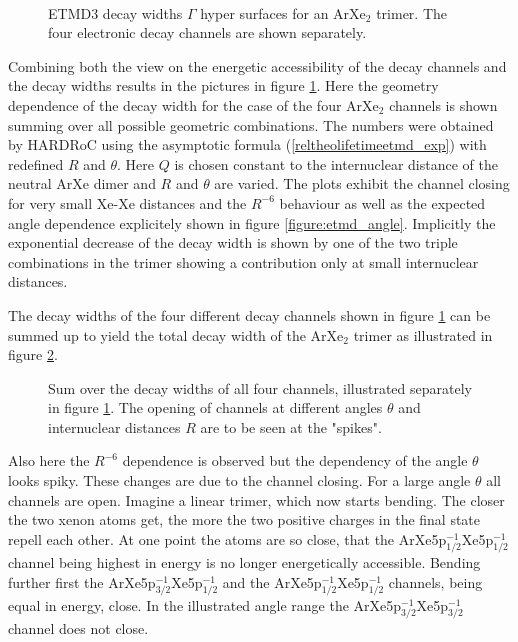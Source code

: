 \begin{figure}[ht]
 \centering
 
 \\
 
 
 \caption{\ac{ETMD}3 decay widths $\Gamma$ hyper surfaces for an ArXe$_2$ trimer.
          The four electronic decay channels are shown separately.}
 \label{figure:ArXe2_etmd_geom_gamma}
\end{figure}


Combining both the view on the energetic accessibility of the decay
channels and the decay widths results in the pictures in
figure \ref{figure:ArXe2_etmd_geom_gamma}.
Here the geometry dependence of the decay width for the case of the four ArXe$_2$
channels is shown summing over all possible geometric combinations.
The numbers were obtained by \ac{HARDRoC} using the
asymptotic formula (\ref{reltheolifetimeetmd_exp}) with redefined
$R$ and $\theta$. Here $Q$ is chosen constant
to the internuclear distance of the neutral ArXe dimer and $R$ and $\theta$
are varied. The plots exhibit the channel closing for very small Xe-Xe distances
and the $R^{-6}$ behaviour as well as the expected angle dependence explicitely
shown in figure \ref{figure:etmd_angle}. Implicitly the exponential decrease
of the decay width is shown by one of the two triple combinations in the trimer
showing a contribution only at small internuclear distances.

The decay widths of the four different decay channels shown in
figure \ref{figure:ArXe2_etmd_geom_gamma} can be summed up to yield
the total decay width of the ArXe$_2$ trimer as illustrated in figure
\ref{figure:ArXe2_etmd_geom_gamma_total}.

\begin{figure}[h]
 \centering
 
 \caption{Sum over the decay widths of all four channels, illustrated
          separately in figure \ref{figure:ArXe2_etmd_geom_gamma}.
          The opening of channels at different angles $\theta$ and
          internuclear distances $R$ are to be seen at the "spikes".}
 \label{figure:ArXe2_etmd_geom_gamma_total}
\end{figure}

Also here the $R^{-6}$ dependence is observed but the dependency
of the angle $\theta$ looks spiky. These changes are due to the channel
closing. For a large angle $\theta$ all channels are open. Imagine a linear
trimer, which now starts bending. The closer
the two xenon atoms get, the more the two positive charges in the final
state repell each other. At one point the atoms are so close, that the
ArXe5p$_{1/2}^{-1}$Xe5p$_{1/2}^{-1}$ channel being highest in energy
is no longer energetically accessible. Bending further first the
ArXe5p$_{3/2}^{-1}$Xe5p$_{1/2}^{-1}$ and the
ArXe5p$_{1/2}^{-1}$Xe5p$_{1/2}^{-1}$ channels, being equal in energy,
close. In the illustrated angle range the ArXe5p$_{3/2}^{-1}$Xe5p$_{3/2}^{-1}$
channel does not close.


